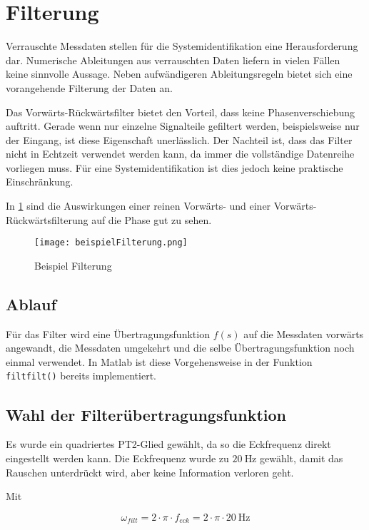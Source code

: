 



\section{Filterung} \label{section:filterung}%
Verrauschte Messdaten stellen für die Systemidentifikation eine Herausforderung dar. Numerische Ableitungen aus verrauschten 
Daten liefern in vielen Fällen keine sinnvolle Aussage. Neben aufwändigeren Ableitungsregeln bietet sich eine vorangehende 
Filterung der Daten an.\par
Das Vorwärts-Rückwärtsfilter bietet den Vorteil, dass keine Phasenverschiebung auftritt. Gerade wenn nur einzelne Signalteile 
gefiltert werden, beispielsweise nur der Eingang, ist diese Eigenschaft unerlässlich. Der Nachteil ist, dass das Filter nicht 
in Echtzeit verwendet werden kann, da immer die vollständige Datenreihe vorliegen muss. Für eine Systemidentifikation ist 
dies jedoch keine praktische Einschränkung.

In \cref{fig:filterBsp} sind die Auswirkungen einer reinen Vorwärts- und einer Vorwärts-Rückwärtsfilterung auf die Phase 
gut zu sehen.

\begin{figure}[h!]
	\centering
	\texttt{[image: beispielFilterung.png]}
	\caption{Beispiel Filterung}
	\label{fig:filterBsp}
\end{figure}


\subsection{Ablauf}
Für das Filter wird eine Übertragungsfunktion $f(s)$ auf die Messdaten vorwärts 
angewandt, die Messdaten umgekehrt und die selbe Übertragungsfunktion noch 
einmal verwendet. In Matlab ist diese Vorgehensweise in der Funktion \texttt{filtfilt()} 
bereits implementiert. 


\subsection{Wahl der Filterübertragungsfunktion}
Es wurde ein quadriertes PT2-Glied gewählt, da so die Eckfrequenz direkt eingestellt werden kann. Die Eckfrequenz wurde zu $ 
\SI{20}{\hertz} $ gewählt, damit das Rauschen unterdrückt wird, aber keine Information verloren geht.

Mit

\begin{equation}
	\omega_{filt} = 2 \cdot \pi \cdot f_{eck} = 2 \cdot \pi \cdot \SI{20}{\hertz}
\end{equation}

